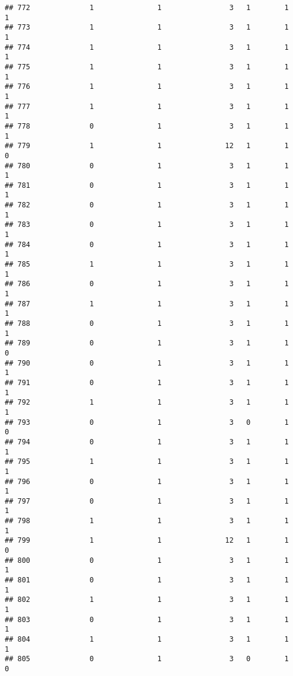 \documentclass[]{article}
\begin{document}
\begin{verbatim}
## 772              1               1                3   1        1        1
## 773              1               1                3   1        1        1
## 774              1               1                3   1        1        1
## 775              1               1                3   1        1        1
## 776              1               1                3   1        1        1
## 777              1               1                3   1        1        1
## 778              0               1                3   1        1        1
## 779              1               1               12   1        1        0
## 780              0               1                3   1        1        1
## 781              0               1                3   1        1        1
## 782              0               1                3   1        1        1
## 783              0               1                3   1        1        1
## 784              0               1                3   1        1        1
## 785              1               1                3   1        1        1
## 786              0               1                3   1        1        1
## 787              1               1                3   1        1        1
## 788              0               1                3   1        1        1
## 789              0               1                3   1        1        0
## 790              0               1                3   1        1        1
## 791              0               1                3   1        1        1
## 792              1               1                3   1        1        1
## 793              0               1                3   0        1        0
## 794              0               1                3   1        1        1
## 795              1               1                3   1        1        1
## 796              0               1                3   1        1        1
## 797              0               1                3   1        1        1
## 798              1               1                3   1        1        1
## 799              1               1               12   1        1        0
## 800              0               1                3   1        1        1
## 801              0               1                3   1        1        1
## 802              1               1                3   1        1        1
## 803              0               1                3   1        1        1
## 804              1               1                3   1        1        1
## 805              0               1                3   0        1        0

\end{verbatim}
\end{document}
